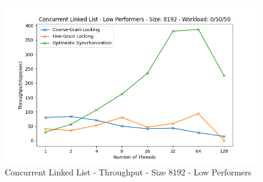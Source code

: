 \documentclass[../final_report.tex]{subfiles}
\begin{document}
\begin{figure}[H]
        \includegraphics[scale=0.4]{outFiles/plots/concurrent_data_structs_low_8192_0_50_50.png}
    \caption{Concurrent Linked List - Throughput - Size 8192 - Low Performers}
    \label{fig:Concurrent Linked List - Throughput - Size 8192 - Low Performers}
\end{figure}
\end{document}
